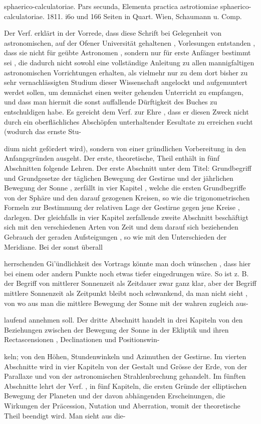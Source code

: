 \documentclass[10pt,a4paper]{article}
\begin{document}
sphaerico-calculatoriae. Pars secunda, Elementa practica astrotiomiae sphaerico-calculatoriae. 1811. i6o und 166 Seiten in Quart. Wien, Schaumann u. Comp.

Der Verf. erklärt in der Vorrede, dass diese Schrift bei Gelegenheit von astronomischen, auf der Ofener Universität gehaltenen , Vorlesungen entstanden , dass sie nicht für geübte Astronomen , sondern nur für erste Anfänger bestimmt sei , die dadurch nicht sowohl eine vollständige Anleitung zu allen mannigfaltigen astronomischen Vorrichtungen erhalten, als vielmehr nur zu dem dort bisher zu sehr vernachlässigten Studium dieser Wissenschaft angelockt und aufgemuntert werdet sollen, um demnächst einen weiter gehenden Unterricht zu empfangen, und dass man hiermit die sonst auffallende Dürftigkeit des Buches zu entschuldigen habe. Es gereicht dem Verf. zur Ehre , dass er diesen Zweck nicht durch ein oberflächliches Abschöpfen unterhaltender Eesultate zu erreichen sucht (wodurch das ernste Stu-

dium nicht gefördert wird), sondern von einer gründlichen Vorbereitung in den Anfangsgründen ausgeht. Der erste, theoretische, Theil enthält in fünf Abschnitten folgende Lehren. Der erste Abschnitt unter dem Titel: Grundbegriff und Grundgesetze der täglichen Bewegung der Gestirne und der jährlichen Bewegung der Sonne , zerfällt in vier Kapitel , welche die ersten Grundbegriffe von der Sphäre und den darauf gezogenen Kreisen, so wie die trigonometrischen Formeln zur Bestimmung der relativen Lage der Gestirne gegen jene Kreise , darlegen. Der gleichfalls in vier Kapitel zerfallende zweite Abschnitt beschäftigt sich mit den verschiedenen Arten von Zeit und dem darauf sich beziehenden Gebrauch der geraden Aufsteigungen , so wie mit den Unterschieden der Meridiane. Bei der sonst überall

herrschenden Gi'ündlichkeit des Vortrags könnte man doch wünschen , dass hier bei einem oder andern Punkte noch etwas tiefer eingedrungen wäre. So ist z. B. der Begriff von mittlerer Sonnenzeit als Zeitdauer zwar ganz klar, aber der Begriff mittlere Sonnenzeit als Zeitpunkt bleibt noch schwankend, da man nicht sieht , von wo aus man die mittlere Bewegung der Sonne mit der wahren zugleich aus-

laufend annehmen soll. Der dritte Abschnitt handelt in drei Kapiteln von den Beziehungen zwischen der Bewegung der Sonne in der Ekliptik und ihren Rectascensionen , Declinationen und Positionswin-

keln; von den Höhen, Stundenwinkeln und Azimuthen der Gestirne. Im vierten Abschnitte wird in vier Kapiteln von der Gestalt und Grösse der Erde, von der Parallaxe und von der astronomischen Strahlenbrechung gehandelt. Im fünften Abschnitte lehrt der Verf. , in fünf Kapiteln, die ersten Gründe der elliptischen Bewegung der Planeten und der davon abhängenden Erscheinungen, die Wirkungen der Präcession, Nutation und Aberration, womit der theoretische Theil beendigt wird. Man sieht aus die-
\end{document}
